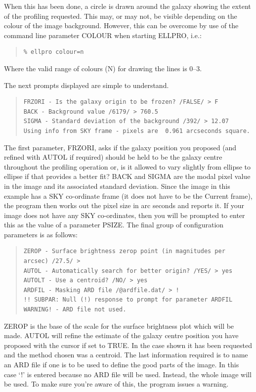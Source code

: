 \documentclass[twoside,11pt]{article}
\newenvironment{myquote}{\begin{quote}\begin{small}}{\end{small}\end{quote}}
\begin{document}
When this has been done, a circle is drawn around the galaxy showing the extent
of the profiling requested. This may, or may not, be visible depending on the
colour of the image background. However, this can be overcome by use of the 
command line parameter COLOUR when starting ELLPRO, i.e.:

\begin{myquote}
\begin{verbatim}
% ellpro colour=n
\end{verbatim}
\end{myquote}

Where the valid range of colours (N) for drawing the lines is 0--3.

The next prompts displayed are simple to understand.

\begin{myquote}
\begin{verbatim}
FRZORI - Is the galaxy origin to be frozen? /FALSE/ > F
BACK - Background value /6179/ > 760.5
SIGMA - Standard deviation of the background /392/ > 12.07
Using info from SKY frame - pixels are  0.961 arcseconds square.
\end{verbatim}
\end{myquote}
The first parameter, FRZORI,
asks if the galaxy position you proposed (and refined with
AUTOL if required) should be held to
be the galaxy centre throughout the profiling operation or, 
is it allowed to vary slightly 
from ellipse to ellipse if that provides a better fit? 
BACK and SIGMA are the modal pixel value in the image and its
associated standard deviation.
Since the image in this example has a SKY co-ordinate frame
(it does not have to be the Current frame),
the program then works out the pixel size in arc seconds and reports it.
If your image does not have any SKY co-ordinates, then you will
be prompted to enter this as the value of a parameter PSIZE.
The final group of configuration parameters is as follows:
\begin{myquote}
\begin{verbatim}
ZEROP - Surface brightness zerop point (in magnitudes per arcsec) /27.5/ > 
AUTOL - Automatically search for better origin? /YES/ > yes
AUTOLT - Use a centroid? /NO/ > yes
ARDFIL - Masking ARD file /@ardfile.dat/ > !
!! SUBPAR: Null (!) response to prompt for parameter ARDFIL
WARNING! - ARD file not used.
\end{verbatim}
\end{myquote}
ZEROP is the base of the scale for the surface brightness plot 
which will be made.
AUTOL will refine 
the estimate of the galaxy centre position you have proposed with the cursor
if set to TRUE. In the case shown it has been requested and the method
chosen was a centroid. 
The last information required is to name an ARD file if one is to be used to
define the good parts of the image. In this case `!' is entered because no
ARD file will be used. Instead, the whole image will be used. To make sure
you're aware of this, the program issues a warning. 
\end{document}
